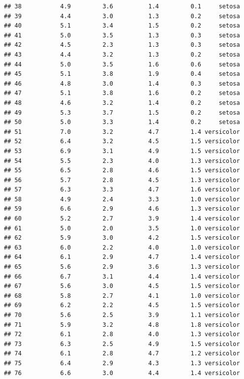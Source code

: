 \documentclass[
]{article}
\begin{document}
\begin{verbatim}
## 38           4.9         3.6          1.4         0.1     setosa
## 39           4.4         3.0          1.3         0.2     setosa
## 40           5.1         3.4          1.5         0.2     setosa
## 41           5.0         3.5          1.3         0.3     setosa
## 42           4.5         2.3          1.3         0.3     setosa
## 43           4.4         3.2          1.3         0.2     setosa
## 44           5.0         3.5          1.6         0.6     setosa
## 45           5.1         3.8          1.9         0.4     setosa
## 46           4.8         3.0          1.4         0.3     setosa
## 47           5.1         3.8          1.6         0.2     setosa
## 48           4.6         3.2          1.4         0.2     setosa
## 49           5.3         3.7          1.5         0.2     setosa
## 50           5.0         3.3          1.4         0.2     setosa
## 51           7.0         3.2          4.7         1.4 versicolor
## 52           6.4         3.2          4.5         1.5 versicolor
## 53           6.9         3.1          4.9         1.5 versicolor
## 54           5.5         2.3          4.0         1.3 versicolor
## 55           6.5         2.8          4.6         1.5 versicolor
## 56           5.7         2.8          4.5         1.3 versicolor
## 57           6.3         3.3          4.7         1.6 versicolor
## 58           4.9         2.4          3.3         1.0 versicolor
## 59           6.6         2.9          4.6         1.3 versicolor
## 60           5.2         2.7          3.9         1.4 versicolor
## 61           5.0         2.0          3.5         1.0 versicolor
## 62           5.9         3.0          4.2         1.5 versicolor
## 63           6.0         2.2          4.0         1.0 versicolor
## 64           6.1         2.9          4.7         1.4 versicolor
## 65           5.6         2.9          3.6         1.3 versicolor
## 66           6.7         3.1          4.4         1.4 versicolor
## 67           5.6         3.0          4.5         1.5 versicolor
## 68           5.8         2.7          4.1         1.0 versicolor
## 69           6.2         2.2          4.5         1.5 versicolor
## 70           5.6         2.5          3.9         1.1 versicolor
## 71           5.9         3.2          4.8         1.8 versicolor
## 72           6.1         2.8          4.0         1.3 versicolor
## 73           6.3         2.5          4.9         1.5 versicolor
## 74           6.1         2.8          4.7         1.2 versicolor
## 75           6.4         2.9          4.3         1.3 versicolor
## 76           6.6         3.0          4.4         1.4 versicolor

\end{verbatim}
\end{document}

